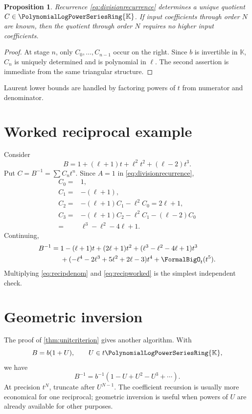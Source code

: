 \documentclass[11pt,oneside,openany]{book}
\newtheorem{proposition}[theorem]{Proposition}
\newcommand{\K}{\mathbb{K}}
\newcommand{\Rring}{\PolynomialLogPowerSeriesRing{\K}}
\begin{document}
\begin{proposition}\label{prop:quotientrec}
Recurrence \cref{eq:divisionrecurrence} determines a unique quotient
\(C\in\Rring\).  If input coefficients through order \(N\) are known, then the
quotient through order \(N\) requires no higher input coefficients.
\end{proposition}

\begin{proof}
At stage \(n\), only \(C_0,\ldots,C_{n-1}\) occur on the right.  Since \(b\)
is invertible in \(\K\), \(C_n\) is uniquely determined and is polynomial in
\(\ell\).  The second assertion is immediate from the same triangular
structure.
\end{proof}

Laurent lower bounds are handled by factoring powers of \(t\) from numerator
and denominator.

\section{Worked reciprocal example}
Consider
\begin{equation}\label{eq:recipdenom}
 B=1+(\ell+1)t+\ell^2t^2+(\ell-2)t^3.
\end{equation}
Put \(C=B^{-1}=\sum C_nt^n\).  Since \(A=1\) in
\cref{eq:divisionrecurrence},
\begin{align*}
 C_0={}&1,\\
 C_1={}&-(\ell+1),\\
 C_2={}&-(\ell+1)C_1-\ell^2C_0=2\ell+1,\\
 C_3={}&-(\ell+1)C_2-\ell^2C_1-(\ell-2)C_0\\
      ={}&\ell^3-\ell^2-4\ell+1.
\end{align*}
Continuing,
\begin{align}\label{eq:recipworked}
 B^{-1}={}&1-(\ell+1)t+(2\ell+1)t^2
 +(\ell^3-\ell^2-4\ell+1)t^3\notag\\
 &+(-\ell^4-2\ell^3+5\ell^2+2\ell-3)t^4
 +\FormalBigO_t(t^5).
\end{align}
Multiplying \cref{eq:recipdenom} and \cref{eq:recipworked} is the simplest
independent check.

\section{Geometric inversion}
The proof of \cref{thm:unitcriterion} gives another algorithm.  With
\[
 B=b(1+U),
 \qquad U\in t\Rring,
\]
we have
\begin{equation}\label{eq:geometricrecip}
 B^{-1}=b^{-1}(1-U+U^2-U^3+\cdots).
\end{equation}
At precision \(t^N\), truncate after \(U^{N-1}\).  The coefficient recursion
is usually more economical for one reciprocal; geometric inversion is useful
when powers of \(U\) are already available for other purposes.
\end{document}
